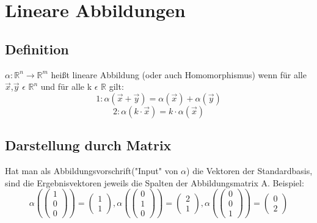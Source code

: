 \documentclass[a4paper,10pt]{scrartcl}
\begin{document}
    \section{Lineare Abbildungen}
        \subsection{Definition}
            $\alpha: \mathbb{R}^n \rightarrow \mathbb{R}^m$ heißt lineare Abbildung (oder auch Homomorphismus) wenn für alle \\$\vec{x}$,$\vec{y}$ $\epsilon$ $\mathbb{R}^n$ und
            für alle k $\epsilon$ $\mathbb{R}$ gilt:
            \[1: \alpha(\vec{x} + \vec{y}) = \alpha(\vec{x}) + \alpha(\vec{y})\]
            \[2: \alpha(k \cdot \vec{x}) = k \cdot \alpha(\vec{x})\]
        \subsection{Darstellung durch Matrix}
            Hat man als Abbildungsvorschrift("Input" von $\alpha$) die Vektoren der Standardbasis, sind die Ergebnisvektoren jeweils die Spalten der Abbildungsmatrix A. Beispiel:
            \[
                \alpha(
                    \begin{pmatrix}
                        1 \\ 0 \\ 0
                    \end{pmatrix}
                ) = 
                \begin{pmatrix}
                    1 \\ 1
                \end{pmatrix},
                \alpha(
                    \begin{pmatrix}
                        0 \\ 1 \\ 0
                    \end{pmatrix}
                ) = 
                \begin{pmatrix}
                    2 \\ 1
                \end{pmatrix},
                \alpha(
                    \begin{pmatrix}
                        0 \\ 0 \\ 1
                    \end{pmatrix}
                ) = 
                \begin{pmatrix}
                    0 \\ 2
                \end{pmatrix}
            \]
\end{document}
